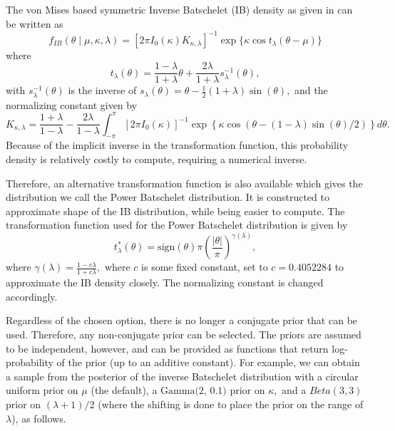 The von Mises based symmetric Inverse Batschelet (IB) density as given
in \citet{jones2012inverse} can be written as
\begin{equation} \label{eqn:invbatpdf}
 f_{IB}(\theta \mid \mu, \kappa, \lambda) = [2\pi I_0(\kappa)K_{\kappa, \lambda}]^{-1} \exp\{\kappa \cos t_\lambda(\theta - \mu)\}
\end{equation} where \begin{equation} \label{eqn:invbattransform}
  t_\lambda(\theta) = \frac{1 - \lambda}{1 + \lambda}\theta + \frac{2\lambda}{1 + \lambda} s_\lambda^{-1}(\theta),
\end{equation} with \(s_\lambda^{-1}(\theta)\) is the inverse of
\(s_\lambda(\theta) = \theta - \frac{1}{2} (1 + \lambda) \sin(\theta),\)
and the normalizing constant given by \begin{equation}
   K_{\kappa, \lambda} = \frac{1 + \lambda}{1 - \lambda} - \frac{2\lambda}{1 - \lambda} \int_{-\pi}^\pi [2\pi I_0(\kappa)]^{-1} \exp\left\{\kappa \cos \left(\theta -  (1 - \lambda) \sin(\theta) / 2 \right) \right\} d\theta.
\end{equation} Because of the implicit inverse in the transformation
function, this probability density is relatively costly to compute,
requiring a numerical inverse.

Therefore, an alternative transformation function is also available
which gives the distribution we call the Power Batschelet distribution.
It is constructed to approximate shape of the IB distribution, while
being easier to compute. The transformation function used for the Power
Batschelet distribution is given by \begin{equation}
  t_{\lambda}^\ast(\theta) = \text{sign}(\theta)\pi \left( \frac{\vert\theta\vert}{\pi} \right)^{\gamma(\lambda)},
\end{equation} where
\(\gamma(\lambda) = \frac{1 - c\lambda}{1 + c\lambda},\) where \(c\) is
some fixed constant, set to \(c = 0.4052284\) to approximate the IB
density closely. The normalizing constant is changed accordingly.

Regardless of the chosen option, there is no longer a conjugate prior
that can be used. Therefore, any non-conjugate prior can be selected.
The priors are assumed to be independent, however, and can be provided
as functions that return log-probability of the prior (up to an additive
constant). For example, we can obtain a sample from the posterior of the
inverse Batschelet distribution with a circular uniform prior on \(\mu\)
(the default), a \(\text{Gamma(2, 0.1)}\) prior on \(\kappa,\) and a
\(Beta(3, 3)\) prior on \((\lambda + 1)/2\) (where the shifting is done
to place the prior on the range of \(\lambda\)), as follows.

